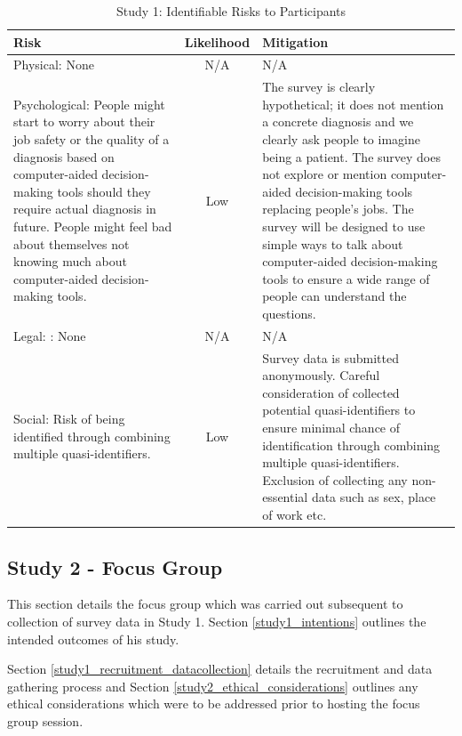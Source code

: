 \documentclass[manuscript,screen,review]{acmart}
\begin{document}
\begin{table}[h]
\begin{center}
\begin{tabular}{ | p{6cm} | c | p{6cm} |}
\hline
 Risk & Likelihood & Mitigation \\
 \hline
 \hline
 Physical: None & N/A & N/A \\
 \hline
 Psychological: People might start to worry about their job safety or the quality of a diagnosis based on computer-aided decision-making tools should they require actual diagnosis in future. People might feel bad about themselves not knowing much about computer-aided decision-making tools. & Low & The survey is clearly hypothetical; it does not mention a concrete diagnosis and we clearly ask people to imagine being a patient. The survey does not explore or mention computer-aided decision-making tools replacing people's jobs. The survey will be designed to use simple ways to talk about computer-aided decision-making tools to ensure a wide range of people can understand the questions. \\
 \hline
 Legal: : None & N/A & N/A \\
 \hline
Social: Risk of being identified through combining multiple quasi-identifiers. & Low & Survey data is submitted anonymously. Careful consideration of collected potential quasi-identifiers to ensure minimal chance of identification through combining multiple quasi-identifiers. Exclusion of collecting any non-essential data such as sex, place of work etc.\\
\hline
\end{tabular}
\caption{Study 1: Identifiable Risks to Participants}
\label{table:study1_risks}
\end{center}
\end{table}







\subsection{Study 2 - Focus Group}

This section details the focus group which was carried out subsequent to collection of survey data in Study 1. Section \ref{study1_intentions} outlines the intended outcomes of his study.

Section \ref{study1_recruitment_datacollection} details the recruitment and data gathering process and Section \ref{study2_ethical_considerations} outlines any ethical considerations which were to be addressed prior to hosting the focus group session.
\end{document}
